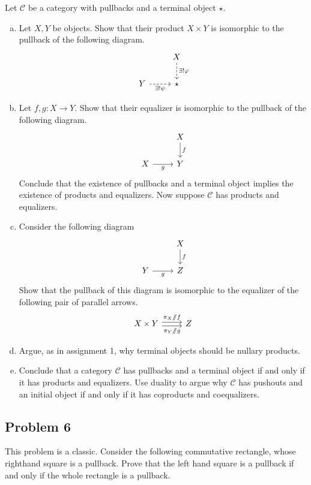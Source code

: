 \documentclass{amsart}
\theoremstyle{remark}
\theoremstyle{definition}
\theoremstyle{definition}
\def\then{\sslash}
\def\mcC{\mathcal{C}}
\begin{document}
Let $\mcC$ be a category with pullbacks and a terminal object $\star$. 
\begin{enumerate}[(a)]
    \item Let $X,Y$ be objects. Show that their product $X\times Y$ is isomorphic to the pullback of the following diagram.
    \[
    \begin{tikzcd}
     {} & X \arrow[d, dashed,"\exists!\varphi"]\\
     Y \arrow[r, dashed,"\exists!\psi"'] & \star 
    \end{tikzcd}
    \]
    
    \item Let $f,g:X\to Y$. Show that their equalizer is isomorphic to the pullback of the following diagram.
    \[
    \begin{tikzcd}
     {} & X \arrow[d,"f"] \\
     X \arrow[r,"g"'] & Y
    \end{tikzcd}
    \]
    Conclude that the existence of pullbacks and a terminal object implies the existence of products and equalizers. Now suppose $\mathcal{C}$ has products and equalizers.
    
    \item Consider the following diagram
    \[
    \begin{tikzcd}
     {} & X \arrow[d,"f"] \\
     Y \arrow[r,"g"'] & Z
    \end{tikzcd}
    \]
    Show that the pullback of this diagram is isomorphic to the equalizer of the following pair of parallel arrows.
    \[
    \begin{tikzcd}
    X\times Y\arrow[r,shift left = .5 ex,"\pi_X\then f"] \arrow[r, shift right = .5 ex, "\pi_Y\then g"'] & Z
    \end{tikzcd}
    \]
    \item Argue, as in assignment 1, why terminal objects should be nullary products.
    
    \item Conclude that a category $\mcC$ has pullbacks and a terminal object if and only if it has products and equalizers. Use duality to argue why $\mcC$ has pushouts and an initial object if and only if it has coproducts and coequalizers.
\end{enumerate}

\subsection{Problem 6}
This problem is a classic. Consider the following commutative rectangle, whose righthand square is a pullback. Prove that the left hand square is a pullback if and only if the whole rectangle is a pullback.
\end{document}
